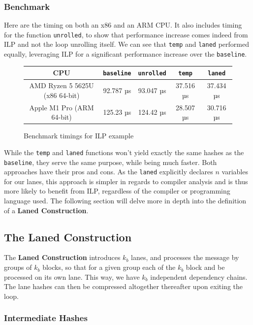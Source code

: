 \documentclass[10pt]{article}
\begin{document}
\clearpage
\subsubsection{Benchmark}
Here are the timing on both an x86 and an ARM CPU. It also includes timing for the function \texttt{unrolled}, to show that performance increase comes indeed from ILP and not the loop unrolling itself.
We can see that \texttt{temp} and \texttt{laned} performed equally, leveraging ILP for a significant performance increase over the \texttt{baseline}.

\begin{figure}[H]
\centering
\begin{tabular}{|c|c|c|c|c|}
\hline
CPU & \texttt{baseline} & \texttt{unrolled} & \texttt{temp} & \texttt{laned} \\
\hline
AMD Ryzen 5 5625U (x86 64-bit) & 92.787 µs & 93.047 µs & 37.516 µs & 37.434 µs \\
Apple M1 Pro (ARM 64-bit) & 125.23 µs & 124.42 µs & 28.507 µs & 30.716 µs \\
\hline
\end{tabular}
\caption{Benchmark timings for ILP example}
\label{tab:your_table_label}
\end{figure}

While the \texttt{temp} and \texttt{laned} functions won't yield exactly the same hashes as the \texttt{baseline}, they serve the same purpose, while being much faster.
Both approaches have their pros and cons. As the \texttt{laned} explicitly declares \( n \) variables for our lanes, this approach is simpler in regards to compiler analysis and is thus more likely to benefit from ILP, regardless of the compiler or programming language used.
The following section will delve more in depth into the definition of a \textbf{Laned Construction}.

\clearpage
\subsection{The Laned Construction}

The \textbf{Laned Construction} introduces \( k_b \) lanes, and processes the message by groups of \( k_b \) blocks, so that for a given group each of the \( k_b \) block and be processed on its own lane. This way, we have \( k_b \) independent dependency chains. The lane hashes can then be compressed altogether thereafter upon exiting the loop.

\subsubsection{Intermediate Hashes}
\end{document}
